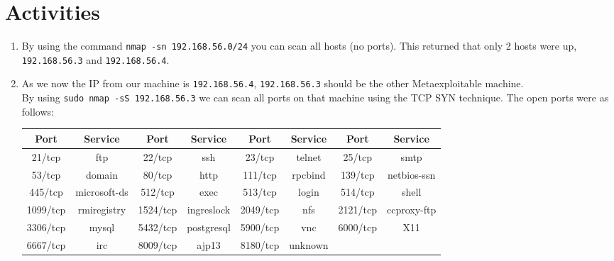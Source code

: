 \section*{Activities}
\begin{enumerate}

    \item By using the command \texttt{nmap -sn 192.168.56.0/24} you can scan all hosts (no ports). This returned that only 2 hosts were up, \texttt{192.168.56.3} and \texttt{192.168.56.4}.


    \item As we now the IP from our machine is \texttt{192.168.56.4}, \texttt{192.168.56.3} should be the other Metaexploitable machine.\\
    By using \texttt{sudo nmap -sS 192.168.56.3} we can scan all ports on that machine using the TCP SYN technique. The open ports were as follows:\\
    \begin{table}[!h]
        \centering
        \begin{tabular}{|c|c||c|c||c|c||c|c|}
            \hline
            \textbf{Port} & \textbf{Service} & \textbf{Port} & \textbf{Service} & \textbf{Port} & \textbf{Service} & \textbf{Port} & \textbf{Service} \\ \hline
            21/tcp        & ftp              & 22/tcp        & ssh              & 23/tcp        & telnet           & 25/tcp        & smtp             \\ \hline
            53/tcp        & domain           & 80/tcp        & http             & 111/tcp       & rpcbind          & 139/tcp       & netbios-ssn      \\ \hline
            445/tcp       & microsoft-ds     & 512/tcp       & exec             & 513/tcp       & login            & 514/tcp       & shell            \\ \hline
            1099/tcp      & rmiregistry      & 1524/tcp      & ingreslock       & 2049/tcp      & nfs              & 2121/tcp      & ccproxy-ftp      \\ \hline
            3306/tcp      & mysql            & 5432/tcp      & postgresql       & 5900/tcp      & vnc              & 6000/tcp      & X11              \\ \hline
            6667/tcp      & irc              & 8009/tcp      & ajp13            & 8180/tcp      & unknown          &               &                  \\ \hline
        \end{tabular}
    \end{table}
    

\end{enumerate}

